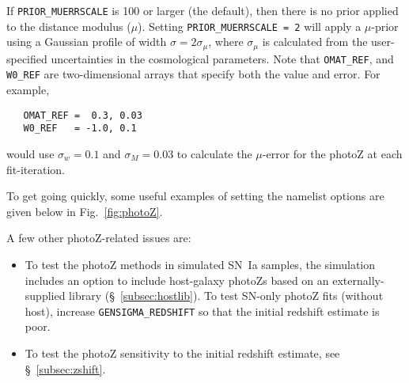 \documentclass[12pt]{article}
\begin{document}

If {\tt PRIOR\_MUERRSCALE} is 100 or larger (the default),
then there is no prior applied to the distance modulus ($\mu$).
Setting {\tt PRIOR\_MUERRSCALE = 2} will apply a $\mu$-prior
using a Gaussian profile of width $\sigma = 2\sigma_{\mu}$,
where $\sigma_{\mu}$ is calculated from the user-specified
uncertainties in the cosmological parameters.
Note that {\tt OMAT\_REF}, and {\tt W0\_REF} are two-dimensional
arrays that specify both the value and error. 
For example,
\begin{verbatim}
   OMAT_REF =  0.3, 0.03  
   W0_REF   = -1.0, 0.1
\end{verbatim}
% 
would use $\sigma_w=0.1$ and $\sigma_M=0.03$ to calculate
the $\mu$-error for the photoZ at each fit-iteration.

To get going quickly, some useful examples of setting
the namelist options are given below in Fig.~\ref{fig:photoZ}.


\bigskip
A few other photoZ-related issues are:
\begin{itemize}
  \item	To test the photoZ methods in simulated SN~Ia samples,
	the simulation includes an option to include host-galaxy 
	photoZs based on an externally-supplied library 
	(\S~\ref{subsec:hostlib}). To test SN-only photoZ
	fits (without host), increase {\tt GENSIGMA\_REDSHIFT}
	so that the initial redshift estimate is poor.
%
\item	To test the photoZ sensitivity to the initial redshift estimate,
        see \S~\ref{subsec:zshift}.
\end{itemize}
\end{document}
